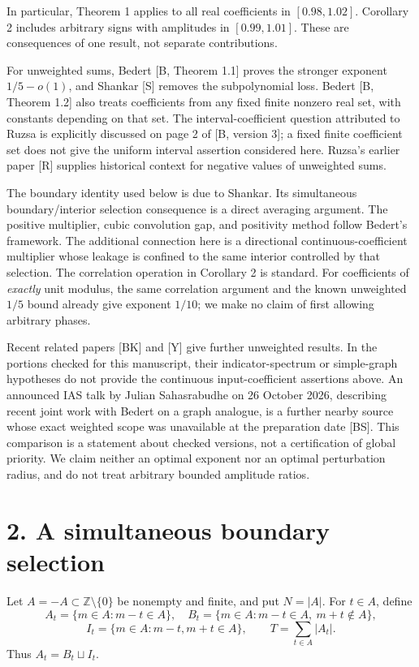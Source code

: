 \documentclass[11pt]{article}
\begin{document}
In particular, Theorem 1 applies to all real coefficients in \([0.98,1.02]\). Corollary 2 includes arbitrary signs with amplitudes in \([0.99,1.01]\). These are consequences of one result, not separate contributions.

For unweighted sums, Bedert [B, Theorem 1.1] proves the stronger exponent \(1/5-o(1)\), and Shankar [S] removes the subpolynomial loss. Bedert [B, Theorem 1.2] also treats coefficients from any fixed finite nonzero real set, with constants depending on that set. The interval-coefficient question attributed to Ruzsa is explicitly discussed on page 2 of [B, version 3]; a fixed finite coefficient set does not give the uniform interval assertion considered here. Ruzsa's earlier paper [R] supplies historical context for negative values of unweighted sums.

The boundary identity used below is due to Shankar. Its simultaneous boundary/interior selection consequence is a direct averaging argument. The positive multiplier, cubic convolution gap, and positivity method follow Bedert's framework. The additional connection here is a directional continuous-coefficient multiplier whose leakage is confined to the same interior controlled by that selection. The correlation operation in Corollary 2 is standard. For coefficients of \emph{exactly} unit modulus, the same correlation argument and the known unweighted \(1/5\) bound already give exponent \(1/10\); we make no claim of first allowing arbitrary phases.

Recent related papers [BK] and [Y] give further unweighted results. In the portions checked for this manuscript, their indicator-spectrum or simple-graph hypotheses do not provide the continuous input-coefficient assertions above. An announced IAS talk by Julian Sahasrabudhe on 26 October 2026, describing recent joint work with Bedert on a graph analogue, is a further nearby source whose exact weighted scope was unavailable at the preparation date [BS]. This comparison is a statement about checked versions, not a certification of global priority. We claim neither an optimal exponent nor an optimal perturbation radius, and do not treat arbitrary bounded amplitude ratios.

\section*{2. A simultaneous boundary selection}

Let \(A=-A\subset\mathbb Z\setminus\{0\}\) be nonempty and finite, and put \(N=|A|\). For \(t\in A\), define
\[
A_t=\{m\in A:m-t\in A\},\quad
B_t=\{m\in A:m-t\in A,\ m+t\notin A\},
\]
\[
I_t=\{m\in A:m-t,m+t\in A\},\qquad T=\sum_{t\in A}|A_t|.
\]
Thus \(A_t=B_t\sqcup I_t\).
\end{document}
